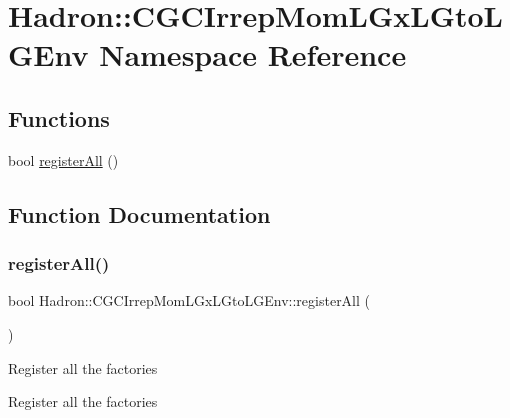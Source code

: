 \hypertarget{namespaceHadron_1_1CGCIrrepMomLGxLGtoLGEnv}{}\section{Hadron\+:\+:C\+G\+C\+Irrep\+Mom\+L\+Gx\+L\+Gto\+L\+G\+Env Namespace Reference}
\label{namespaceHadron_1_1CGCIrrepMomLGxLGtoLGEnv}
\subsection*{Functions}
\begin{DoxyCompactItemize}
\item 
bool \mbox{\hyperlink{namespaceHadron_1_1CGCIrrepMomLGxLGtoLGEnv_ab765f2f3a5f090ad99642c37e973a15d}{register\+All}} ()
\end{DoxyCompactItemize}


\subsection{Function Documentation}
\mbox{\label{namespaceHadron_1_1CGCIrrepMomLGxLGtoLGEnv_ab765f2f3a5f090ad99642c37e973a15d}} 
\subsubsection{\texorpdfstring{registerAll()}{registerAll()}}
{\footnotesize\ttfamily bool Hadron\+::\+C\+G\+C\+Irrep\+Mom\+L\+Gx\+L\+Gto\+L\+G\+Env\+::register\+All (\begin{DoxyParamCaption}{ }\end{DoxyParamCaption})}

Register all the factories

Register all the factories

